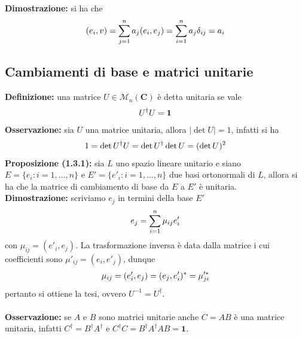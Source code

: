 \documentclass{article}
\begin{document}
\textbf{Dimostrazione:} si ha che
\begin{align}
    (e_i, v) = \sum_{j = 1}^n a_j(e_i, e_j) = \sum_{i = 1}^n a_j\delta_{ij} = a_i \notag
\end{align}

\newpage
\subsection{Cambiamenti di base e matrici unitarie}
\textbf{Definizione:} una matrice $U \in \mathcal{M}_n(\mathbf{C})$ è detta unitaria se vale
\begin{gather}
    U^\dagger U = \mathbf{1} \notag
\end{gather}
\textbf{Osservazione:} sia $U$ una matrice unitaria, allora $|\det U| = 1$, infatti si ha
\begin{gather}
    1 = \det U^\dagger U = \det U^\dagger \det U = (\det U)^2 \notag
\end{gather}
\textbf{Proposizione (1.3.1):} sia $L$ uno spazio lineare unitario e siano $E = \{e_i : i = 1, \dots, n\}$ e $E' = \{e'_i : i = 1, \dots, n\}$ due basi ortonormali di $L$, allora si ha che la matrice di cambiamento di base da $E$ a $E'$ è unitaria. \\

\textbf{Dimostrazione:} scriviamo $e_j$ in termini della base $E'$
\begin{gather}
    e_j = \sum_{i = 1}^n \mu_{ij}e'_i \notag
\end{gather}
con $\mu_{ij} = (e'_i, e_j)$. La trasformazione inversa è data dalla matrice i cui coefficienti sono $\mu'_{ij} = (e_i, e'_j)$, dunque
\begin{gather}
    \mu_{ij} = (e'_i, e_j) = (e_j, e'_i)^* = \mu'^*_{ji} \notag
\end{gather}
pertanto si ottiene la tesi, ovvero $U^{-1} = U^\dagger$. \\ \\
\textbf{Osservazione:} se $A$ e $B$ sono matrici unitarie anche $C = AB$ è una matrice unitaria, infatti $C^\dagger = B^\dagger A^\dagger$ e $C^\dagger C = B^\dagger A^\dagger A B = \mathbf{1}$.

\newpage
\end{document}
